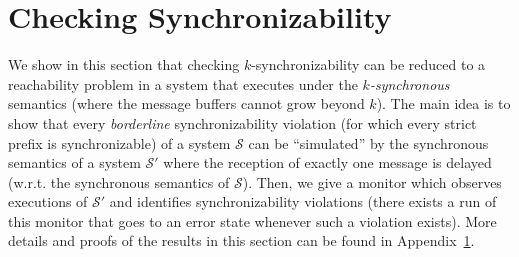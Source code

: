 \section{Checking Synchronizability}\label{sec:verif}

We show in this section that checking $k$-synchronizability can be reduced 
to a reachability problem in a system
that executes under the \emph{$k$-synchronous} semantics 
(where the message buffers cannot grow beyond $k$). The main idea is to show that every
\emph{borderline} synchronizability violation (for which every strict prefix is synchronizable) of a system $\mathcal{S}$ can be ``simulated''
by the synchronous semantics of a system $\mathcal{S'}$ where the reception of exactly one message is delayed (w.r.t. the synchronous semantics of $\mathcal{S}$).
Then, we give a monitor which observes executions of $\mathcal{S'}$ and identifies synchronizability violations
(there exists a run of this monitor that goes to an error state whenever such a violation exists). More details and proofs of the results in this section can be found in Appendix~\ref{sec:verif}.

